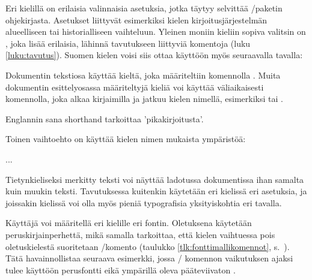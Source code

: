 \begin{koodilohkosis}
  \usepackage{polyglossia}
  \setdefaultlanguage{finnish}
\end{koodilohkosis}

Eri kielillä on erilaisia valinnaisia asetuksia, jotka täytyy selvittää
\-/paketin ohjekirjasta. Asetukset liittyvät
esimerkiksi kielen kirjoitusjärjestelmän alueelliseen tai
historialliseen vaihteluun. Yleinen moniin kieliin sopiva valitsin on
, joka lisää erilaisia, lähinnä tavutukseen
liittyviä komentoja (luku \ref{luku:tavutus}). Suomen kielen voisi siis
ottaa käyttöön myös seuraavalla tavalla:

\begin{koodilohkosis}
  \setdefaultlanguage[babelshorthands]{finnish}
\end{koodilohkosis}

Dokumentin tekstiosa käyttää kieltä, joka määriteltiin komennolla
. Muita dokumentin esittelyosassa
määriteltyjä kieliä voi käyttää väliaikaisesti komennolla, joka alkaa
kirjaimilla  ja jatkuu kielen nimellä, esimerkiksi
 tai .

\begin{koodilohkosis}
  Englannin sana \textenglish{shorthand} tarkoittaa 'pikakirjoitusta'.
\end{koodilohkosis}

Toinen vaihtoehto on käyttää kielen nimen mukaista ympäristöä:

\begin{koodilohkosis}
  \begin{greek}
    ...
  \end{greek}
\end{koodilohkosis}

Tietynkieliseksi merkitty teksti voi näyttää ladotussa dokumentissa ihan
samalta kuin muukin teksti. Tavutuksessa kuitenkin käytetään eri
kielissä eri asetuksia, ja joissakin kielissä voi olla myös pieniä
typografisia yksityiskohtia eri tavalla.

Käyttäjä voi määritellä eri kielille eri fontin. Oletuksena käytetään
peruskirjainperhettä, mikä samalla tarkoittaa, että kielen vaihtuessa
pois oletuskielestä suoritetaan \-/komento (taulukko
\ref{tlk:fonttimallikomennot}, s.~\pageref{tlk:fonttimallikomennot}).
Tätä havainnollistaa seuraava esimerkki, jossa \-/
komennon vaikutuksen ajaksi tulee käyttöön perusfontti
 eikä ympärillä oleva pääteviivaton
.

